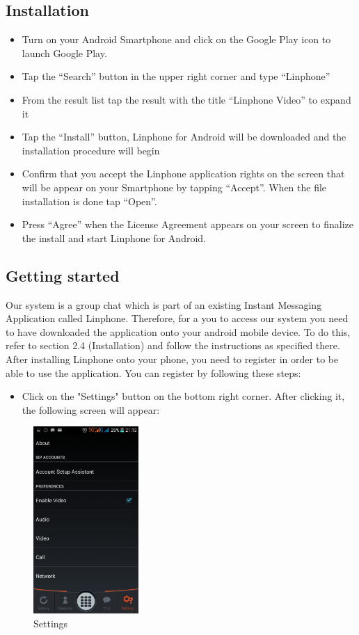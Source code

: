 \documentclass[a4paper]{article}
\begin{document}
\subsection{Installation}
\begin{itemize}
\item Turn on your Android Smartphone and click on the Google Play icon to launch Google Play.
\item Tap the “Search” button in the upper right corner and type “Linphone”
\item From the result list tap the result with the title “Linphone Video” to expand it
\item Tap the “Install” button, Linphone for Android will be downloaded and the installation procedure will begin
\item Confirm that you accept the Linphone application rights on the screen that will be appear on your Smartphone by tapping “Accept”. When the file installation is done tap “Open”.
\item Press “Agree” when the License Agreement appears on your screen to finalize the install and start Linphone for Android.
\end{itemize}

\subsection{Getting started}
Our system is a group chat which is part of an existing Instant Messaging Application called Linphone. Therefore, for a you to access our system you need to have downloaded the application onto your android mobile device. To do this,  refer to section 2.4 (Installation) and follow the instructions as specified there. After installing Linphone onto your phone, you need to register in order to be able to use the application.
You can register by following these steps:
\begin{itemize}
\item Click on the "Settings" button on the bottom right corner. After clicking it, the following screen will appear:
\end{itemize}

\begin{figure}[h]
\centering
\includegraphics[scale=0.30, width=40mm]{./pictures/settings.png}
\caption{\label{fig:Agile}Settings}
\end{figure}
\end{document}
